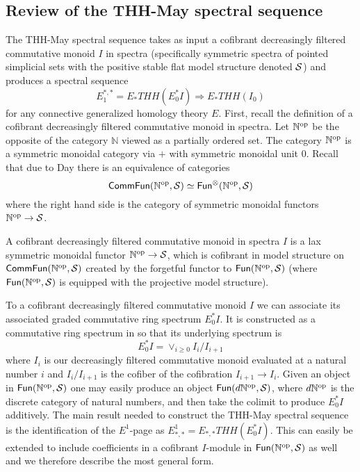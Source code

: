 \subsection{Review of the THH-May spectral sequence}
The THH-May spectral sequence takes as input a cofibrant decreasingly filtered commutative monoid $I$ in spectra (specifically symmetric spectra of pointed simplicial sets with the positive stable flat model structure denoted $\mathcal{S}$) and produces a spectral sequence 
\[ E_1^{*,*}=E_*THH(E_0^*I) \Rightarrow E_*THH(I_0)\]
for any connective generalized homology theory $E$.
First, recall the definition of a cofibrant decreasingly filtered commutative monoid in spectra. Let $\mathbb{N}^{\mathrm{op}}$ be the opposite of the category $\mathbb{N}$ viewed as a partially ordered set. The category $\mathbb{N}^{\mathrm{op}}$ is a symmetric monoidal category via $+$ with symmetric monoidal unit $0$. Recall that due to Day \cite{Day70} there is an equivalence of categories 
\[ \mathsf{Comm} \mathsf{Fun}(\mathbb{N}^{\mathrm{op}},\mathcal{S}) \simeq \mathsf{Fun}^{\otimes}(\mathbb{N}^{\mathrm{op}},\mathcal{S})\]
where the right hand side is the category of symmetric monoidal functors $\mathbb{N}^{\mathrm{op}}\to \mathcal{S}$.
\begin{defn} \label{cdfcms}
A cofibrant decreasingly filtered commutative monoid in spectra $I$ is a lax symmetric monoidal functor $\mathbb{N}^{\mathrm{op}}\rightarrow \mathcal{S}$, which is cofibrant in model structure on 
$\mathsf{Comm} \mathsf{Fun}(\mathbb{N}^{\mathrm{op}},\mathcal{S})$ created by the forgetful functor to $\mathsf{Fun}(\mathbb{N}^{\mathrm{op}},\mathcal{S})$ (where $\mathsf{Fun}(\mathbb{N}^{\mathrm{op}},\mathcal{S})$ is equipped with the projective model structure). 
\end{defn}
To a cofibrant decreasingly filtered commutative monoid $I$ we can associate its associated graded commutative ring spectrum $E_0^*I$. It is constructed as a commutative ring spectrum in \cite[Def. 3.16]{THH-May} so that its underlying spectrum is 
\[ E_0^*I=\vee_{i\ge 0} I_i/I_{i+1}\] 
where $I_i$ is our decreasingly filtered commutative monoid evaluated at a natural number $i$ and $I_i/I_{i+1}$ is the cofiber of the cofibration $I_{i+1}\rightarrow I_i$. Given an object in $\mathsf{Fun}(\mathbb{N}^{\mathrm{op}},\mathcal{S})$ one may easily produce an object $\mathsf{Fun}(d\mathbb{N}^{\mathrm{op}},\mathcal{S})$, where $d\mathbb{N}^{\mathrm{op}}$ is the discrete category of natural numbers, and then take the colimit to produce $E_0^*I$ additively. The main result needed to construct the THH-May spectral sequence is the identification of the $E^1$-page as $E^1_{*,*}=E_{*,*}THH(E_0^*I)$. This can easily be extended to include coefficients in a cofibrant $I$-module in $\mathsf{Fun}(\mathbb{N}^{\mathrm{op}},\mathcal{S})$ as well and we therefore describe the most general form. 
